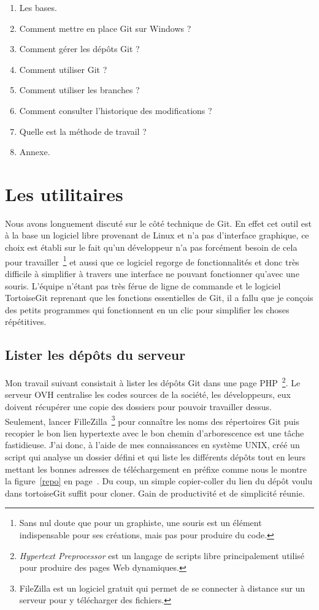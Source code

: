 \begin{enumerate}
    \item Les bases.
    \item Comment mettre en place Git sur Windows ?
    \item Comment gérer les dépôts Git ?
    \item Comment utiliser Git ?
    \item Comment utiliser les branches ?
    \item Comment consulter l'historique des modifications ?
    \item Quelle est la méthode de travail ?
    \item Annexe.
\end{enumerate}

\section{Les utilitaires} %
\label{sec:Les utilitaires}
Nous avons longuement discuté sur le côté technique de Git. En effet cet outil
est à la base un logiciel libre provenant de Linux et n'a pas d'interface
graphique, ce choix est établi sur le fait qu'un développeur n'a pas forcément
besoin de cela pour travailler\, \footnote{Sans nul doute que pour un
graphiste, une souris est un élément indispensable pour ses créations, mais pas
pour produire du code.} et aussi que ce logiciel regorge de fonctionnalités et
donc très difficile à simplifier à travers une interface ne pouvant fonctionner
qu'avec une souris. L'équipe n'étant pas très férue de ligne de commande et le
logiciel TortoiseGit reprenant que les fonctions essentielles de Git, il a
fallu que je conçois des petits programmes qui fonctionnent en un clic pour
simplifier les choses répétitives.

\subsection{Lister les dépôts du serveur} %
\label{sub:Lister les dépôts du serveur}

Mon travail suivant consistait à lister les dépôts Git dans une page PHP\,
\footnote{\emph{Hypertext Preprocessor} est un langage de scripts libre
principalement utilisé pour produire des pages Web dynamiques.}. Le serveur OVH
centralise les codes sources de la société, les développeurs, eux doivent
récupérer une copie des dossiers pour pouvoir travailler dessus. Seulement,
lancer FilleZilla\, \footnote{FileZilla est un logiciel gratuit qui permet de
se connecter à distance sur un serveur pour y télécharger des fichiers.} pour
connaître les noms des répertoires Git puis recopier le bon lien hypertexte
avec le bon chemin d'arborescence est une tâche fastidieuse.  J'ai donc, à
l'aide de mes connaissances en système UNIX, créé un script qui analyse un
dossier défini et qui liste les différents dépôts tout en leurs mettant les
bonnes adresses de téléchargement en préfixe comme nous le montre la
figure~\ref{repo} en page~\pageref{repo}. Du coup, un simple copier-coller du
lien du dépôt voulu dans tortoiseGit suffit pour cloner. Gain de productivité
et de simplicité réunie.

